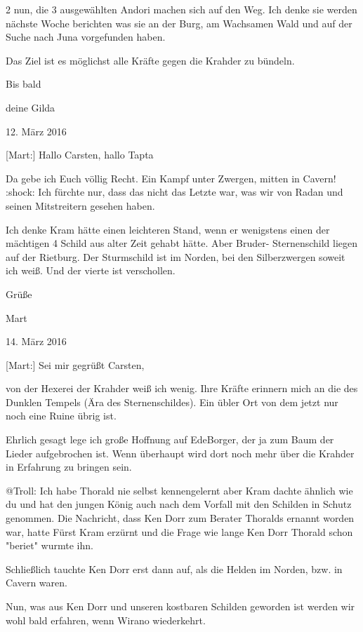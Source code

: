 \documentclass[10pt, a4paper, oneside]{book}
\begin{document}
\begin{multicols}{2}
nun, die 3 ausgewählten Andori machen sich auf den Weg. Ich denke sie werden nächste Woche berichten was sie an der Burg, am Wachsamen Wald und auf der Suche nach Juna vorgefunden haben.

Das Ziel ist es möglichst alle Kräfte gegen die Krahder zu bündeln.

Bis bald

deine Gilda

\begin{center}
    12. März 2016
\end{center}


[Mart:] Hallo Carsten, hallo Tapta

Da gebe ich Euch völlig Recht. Ein Kampf unter Zwergen, mitten in Cavern! :shock: Ich fürchte nur, dass das nicht das Letzte war, was wir von Radan und seinen Mitstreitern gesehen haben.

Ich denke Kram hätte einen leichteren Stand, wenn er wenigstens einen der mächtigen 4 Schild aus alter Zeit gehabt hätte. Aber Bruder- Sternenschild liegen auf der Rietburg. Der Sturmschild ist im Norden, bei den Silberzwergen soweit ich weiß. Und der vierte ist verschollen.

Grüße

Mart

\begin{center}
    14. März 2016
\end{center}

[Mart:] Sei mir gegrüßt Carsten,

von der Hexerei der Krahder weiß ich wenig. Ihre Kräfte erinnern mich an die des Dunklen Tempels (Ära des Sternenschildes). Ein übler Ort von dem jetzt nur noch eine Ruine übrig ist.

Ehrlich gesagt lege ich große Hoffnung auf EdeBorger, der ja zum Baum der Lieder aufgebrochen ist. Wenn überhaupt wird dort noch mehr über die Krahder in Erfahrung zu bringen sein.

@Troll: Ich habe Thorald nie selbst kennengelernt aber Kram dachte ähnlich wie du und hat den jungen König auch nach dem Vorfall mit den Schilden in Schutz genommen. Die Nachricht, dass Ken Dorr zum Berater Thoralds ernannt worden war, hatte Fürst Kram erzürnt und die Frage wie lange Ken Dorr Thorald schon "beriet" wurmte ihn.

Schließlich tauchte Ken Dorr erst dann auf, als die Helden im Norden, bzw. in Cavern waren.

Nun, was aus Ken Dorr und unseren kostbaren Schilden geworden ist werden wir wohl bald erfahren, wenn Wirano wiederkehrt.



\end{multicols}
\end{document}
